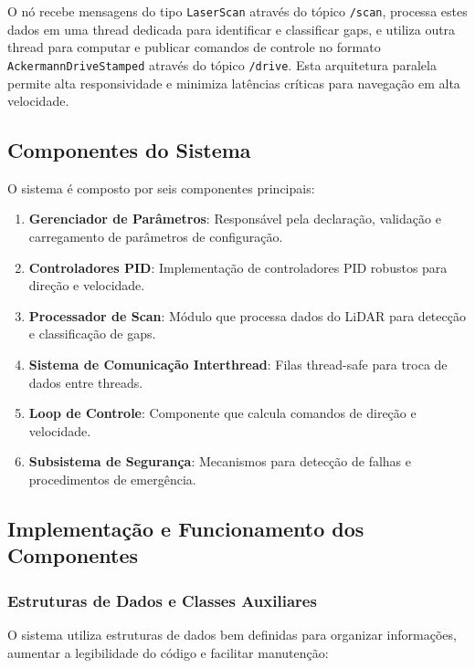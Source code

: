 O nó recebe mensagens do tipo \texttt{LaserScan} através do tópico
\texttt{/scan}, processa estes dados em uma thread dedicada para identificar e
classificar gaps, e utiliza outra thread para computar e publicar comandos de
controle no formato \texttt{AckermannDriveStamped} através do tópico
\texttt{/drive}. Esta arquitetura paralela permite alta responsividade e
minimiza latências críticas para navegação em alta velocidade.

\subsection{Componentes do Sistema}

O sistema é composto por seis componentes principais:

\begin{enumerate}
    \item \textbf{Gerenciador de Parâmetros}: Responsável pela declaração, validação e carregamento de parâmetros de configuração.
    \item \textbf{Controladores PID}: Implementação de controladores PID robustos para direção e velocidade.
    \item \textbf{Processador de Scan}: Módulo que processa dados do LiDAR para detecção e classificação de gaps.
    \item \textbf{Sistema de Comunicação Interthread}: Filas thread-safe para troca de dados entre threads.
    \item \textbf{Loop de Controle}: Componente que calcula comandos de direção e velocidade.
    \item \textbf{Subsistema de Segurança}: Mecanismos para detecção de falhas e procedimentos de emergência.
\end{enumerate}

\subsection{Implementação e Funcionamento dos Componentes}

\subsubsection{Estruturas de Dados e Classes Auxiliares}

O sistema utiliza estruturas de dados bem definidas para organizar informações,
aumentar a legibilidade do código e facilitar manutenção:

